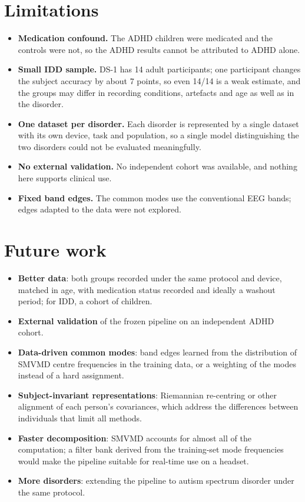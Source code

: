 \section{Limitations}
\begin{itemize}
\item \textbf{Medication confound.} The ADHD children were medicated and the controls were not,
      so the ADHD results cannot be attributed to ADHD alone.
\item \textbf{Small IDD sample.} DS-1 has 14 adult participants; one participant changes the
      subject accuracy by about 7 points, so even 14/14 is a weak estimate, and the groups may
      differ in recording conditions, artefacts and age as well as in the disorder.
\item \textbf{One dataset per disorder.} Each disorder is represented by a single dataset with its
      own device, task and population, so a single model distinguishing the two disorders could
      not be evaluated meaningfully.
\item \textbf{No external validation.} No independent cohort was available, and nothing here
      supports clinical use.
\item \textbf{Fixed band edges.} The common modes use the conventional EEG bands; edges adapted to
      the data were not explored.
\end{itemize}

\section{Future work}
\begin{itemize}
\item \textbf{Better data}: both groups recorded under the same protocol and device, matched in
      age, with medication status recorded and ideally a washout period; for IDD, a cohort of
      children.
\item \textbf{External validation} of the frozen pipeline on an independent ADHD cohort.
\item \textbf{Data-driven common modes}: band edges learned from the distribution of SMVMD
      centre frequencies in the training data, or a weighting of the modes instead of a hard
      assignment.
\item \textbf{Subject-invariant representations}: Riemannian re-centring or other alignment of
      each person's covariances, which address the differences between individuals that limit
      all methods.
\item \textbf{Faster decomposition}: SMVMD accounts for almost all of the computation; a
      filter bank derived from the training-set mode frequencies would make the pipeline
      suitable for real-time use on a headset.
\item \textbf{More disorders}: extending the pipeline to autism spectrum disorder under the same
      protocol.
\end{itemize}
